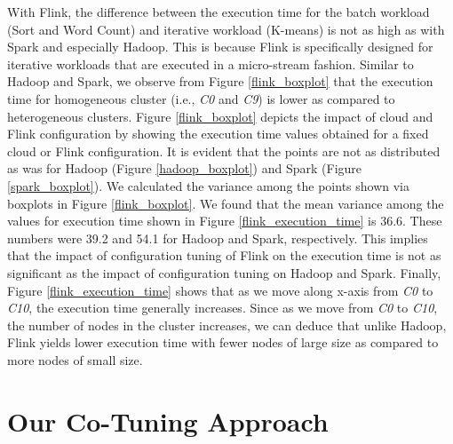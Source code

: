 \documentclass[3p]{elsarticle}
\begin{document}
With Flink, the difference between the execution time for the batch workload (Sort and Word Count) and iterative workload (K-means) is not as high as with Spark and especially Hadoop. This is because Flink is specifically designed for iterative workloads that are executed in a micro-stream fashion. Similar to Hadoop and Spark, we observe from Figure \ref{flink_boxplot} that the execution time for homogeneous cluster (i.e., \textit{C0} and \textit{C9}) is lower as compared to heterogeneous clusters. Figure \ref{flink_boxplot} depicts the impact of cloud and Flink configuration by showing the execution time values obtained for a fixed cloud or Flink configuration. It is evident that the points are not as distributed as was for Hadoop (Figure \ref{hadoop_boxplot}) and Spark (Figure \ref{spark_boxplot}). We calculated the variance among the points shown via boxplots in Figure \ref{flink_boxplot}. We found that the mean variance among the values for execution time shown in Figure \ref{flink_execution_time} is 36.6. These numbers were 39.2 and 54.1 for Hadoop and Spark, respectively. This implies that the impact of configuration tuning of Flink on the execution time is not as significant as the impact of configuration tuning on Hadoop and Spark. Finally, Figure \ref{flink_execution_time} shows that as we move along x-axis from \textit{C0} to \textit{C10}, the execution time generally increases. Since as we move from \textit{C0} to \textit{C10}, the number of nodes in the cluster increases, we can deduce that unlike Hadoop, Flink yields lower execution time with fewer nodes of large size as compared to more nodes of small size. 




\section{Our Co-Tuning Approach}
\end{document}
